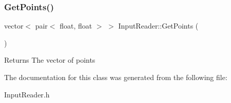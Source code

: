 \subsubsection{\texorpdfstring{Get\+Points()}{GetPoints()}}
{\footnotesize\ttfamily vector$<$ pair$<$ float, float $>$ $>$ Input\+Reader\+::\+Get\+Points (\begin{DoxyParamCaption}{ }\end{DoxyParamCaption})}

\begin{DoxyReturn}{Returns}
The vector of points 
\end{DoxyReturn}


The documentation for this class was generated from the following file\+:\begin{DoxyCompactItemize}
\item 
Input\+Reader.\+h\end{DoxyCompactItemize}
